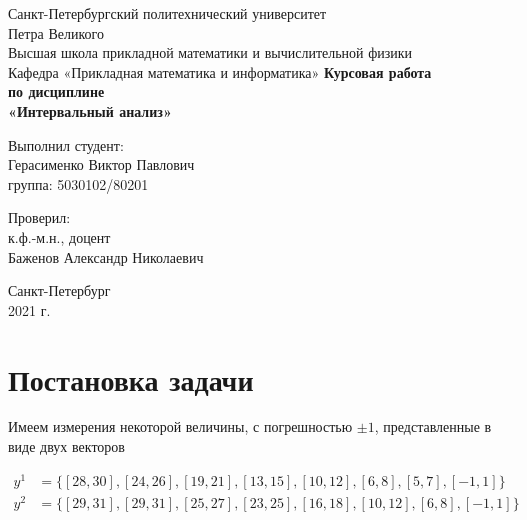 \documentclass[12pt,a4paper]{article}
\begin{document}
    \begin{titlepage}
    		\begin{center}		
    			\vfill	
    			Санкт-Петербургский политехнический университет \\
    			Петра Великого\\
    			\vskip 1cm
    			Высшая школа прикладной математики и вычислительной физики \\
    			Кафедра «Прикладная математика и информатика»
    			\vfill
    			\textbf{Курсовая работа\\
    				по дисциплине\\
    				«Интервальный анализ»\\}
    			\vfill
    		\end{center}
    		\vfill
    		\hfill
    		\begin{minipage}{0.4\textwidth}
    			Выполнил студент:\\
    			Герасименко Виктор Павлович\\
    			группа: 5030102/80201\\
    		\end{minipage}
    		\vfill
    		\hfill 
    		\begin{minipage}{0.4\textwidth}
    			Проверил:\\
    			к.ф.-м.н., доцент\\
    			Баженов Александр Николаевич\
    		\end{minipage}
    		\vfill
    		\hfill 
    		\begin{center}
    			Санкт-Петербург\\2021 г.
    		\end{center}
    	\end{titlepage}
    	
    	\tableofcontents
    	\listoffigures
    	\pagebreak
    	
    	
    \section{Постановка задачи}
        Имеем измерения некоторой величины, с погрешностью $\pm1$, представленные в виде двух векторов
        
        \begin{align}
        y^{1} &= \{  [28, 30],  [24, 26],   [19, 21],   [13, 15],   [10, 12],   [6, 8],   [5, 7],    [-1, 1]\} \\
        y^{2} &= \{  [29, 31],  [29, 31],   [25, 27],   [23, 25],   [16, 18],   [10, 12],   [6, 8],     [-1, 1]\}
        \end{align}
        
\end{document}
